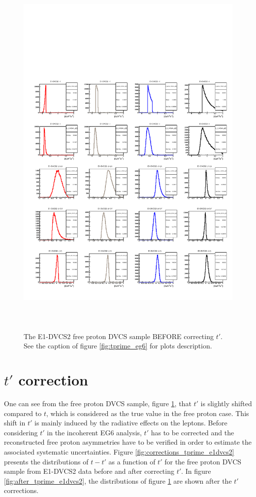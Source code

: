 \documentclass[a4paper,11pt,twoside]{article}
\begin{document}
\begin{figure}[h!]
\centering
\includegraphics[height=19.0cm]{fig/before_corrections_E1-dvcs2-t_tprime_Incoh.pdf}
\caption{The E1-DVCS2 free proton DVCS sample BEFORE correcting $t'$. See the 
caption of figure \ref{fig:tprime_eg6} for plots description.}
\label{fig:tprime_e1dvcs2}
\end{figure}


\section{$t'$ correction}
One can see from the free proton DVCS sample, figure \ref{fig:tprime_e1dvcs2}, 
that $t'$ is slightly shifted compared to $t$, which is considered as the true 
value in the free proton case. This shift in $t'$ is mainly induced by the 
radiative effects on the leptons. Before considering $t'$ in the incoherent EG6 
analysis, $t'$ has to be corrected and the reconstructed free proton 
asymmetries have to be verified in order to estimate the associated systematic 
uncertainties. Figure \ref{fig:corrections_tprime_e1dvcs2} presents the 
distributions of $t-t'$ as a function of $t'$ for the free proton DVCS sample 
from E1-DVCS2 data before and after correcting $t'$. In figure 
\ref{fig:after_tprime_e1dvcs2}, the distributions of figure 
\ref{fig:tprime_e1dvcs2} are shown after the $t'$ corrections.
\end{document}
